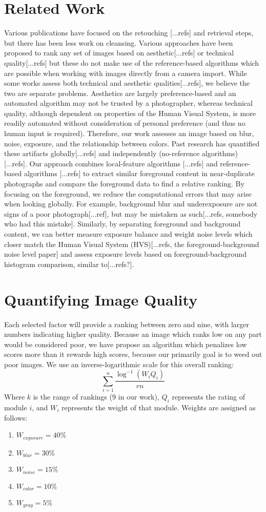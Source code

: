 \documentclass[twocolumn]{article}
\begin{document}
\section{Related Work}
Various publications have focused on the retouching [...refs] and retrieval\cite{Yeh:2010:PPR:1873951.1873963} steps, but there has been less work on cleansing.
Various approaches have been proposed to rank any set of images based on aesthetic[...refs] or technical quality[...refs] but these do not make use of the reference-based algorithms which are possible when working with images directly from a camera import. While some works assess both technical and aesthetic qualities[...refs], we believe the two are separate problems. Aesthetics are largely preference-based and an automated algorithm may not be trusted by a photographer, whereas technical quality, although dependent on properties of the Human Visual System, is more readily automated without consideration of personal preference (and thus no human input is required).
Therefore, our work assesses an image based on blur, noise, exposure, and the relationship between colors. Past research has quantified these artifacts globally[...refs] and independently (no-reference algorithms) [...refs]. Our approach combines local-feature algorithms [...refs] and reference-based algorithms [...refs] to extract similar foreground content in near-duplicate photographs and compare the foreground data to find a relative ranking. By focusing on the foreground, we reduce the computational errors that may arise when looking globally. For example, background blur and underexposure are not signs of a poor photograph[...ref], but may be mistaken as such[...refs, somebody who had this mistake].
Similarly, by separating foreground and background content, we can better measure exposure balance and weight noise levels which closer match the Human Visual System (HVS)[...refs, the foreground-background noise level paper] and assess exposure levels based on foreground-background histogram comparison, similar to[...refs?].
\section{Quantifying Image Quality}
Each selected factor will provide a ranking between zero and nine, with larger numbers indicating higher quality. Because an image which ranks low on any part would be considered poor, we have propose an algorithm which penalizes low scores more than it rewards high scores, because our primarily goal is to weed out poor images. We use an inverse-logarithmic scale for this overall ranking:
\[
\displaystyle\sum\limits_{i=1}^n\frac{\log^{-1}(W_iQ_i)}{rn}
\]
Where \(k\) is the range of rankings (9 in our work), \(Q_i\) represents the rating of module \(i\), and \(W_i\) represents the weight of that module. Weights are assigned as follows:
\begin{enumerate}
\item \(W_{exposure}=40\%\)
\item \(W_{blur}=30\%\)
\item \(W_{noise}=15\%\)
\item \(W_{color}=10\%\)
\item \(W_{gray}=5\%\)
\end{enumerate}
\end{document}
